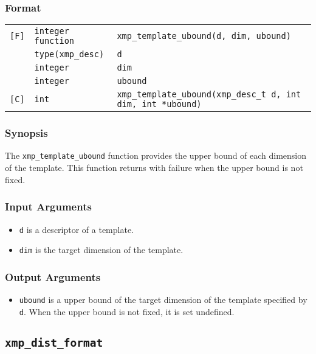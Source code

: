 \subsubsection*{Format}

\begin{tabular}{lll}

\verb![F]!& {\tt integer function}& {\tt xmp\_template\_ubound(d, dim, ubound)}\\
          & {\tt type(xmp\_desc)} & {\tt d}\\
          & {\tt integer} & {\tt dim}\\
          & {\tt integer} & {\tt ubound}\\

\verb![C]!&  {\tt int}& {\tt xmp\_template\_ubound(xmp\_desc\_t d, int dim, int *ubound)}\\

\end{tabular}

\subsubsection*{Synopsis}

The {\tt xmp\_template\_ubound} function provides the upper bound of each
dimension of the template. This function returns with failure when the
upper bound is not fixed.

\subsubsection*{Input Arguments}
\begin{itemize}
 \item {\tt d} is a descriptor of a template.
 \item {\tt dim} is the target dimension of the template.
\end{itemize}

\subsubsection*{Output Arguments}
\begin{itemize}
 \item {\tt ubound} is a upper bound of the target dimension of the
       template specified by {\tt d}. When the upper bound is not fixed,
       it is set undefined.
\end{itemize}


\subsection{\tt xmp\_dist\_format}

